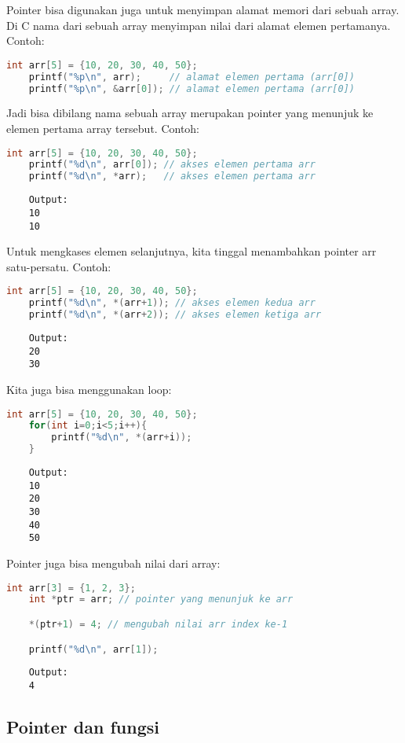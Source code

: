 Pointer bisa digunakan juga untuk menyimpan alamat memori dari sebuah array.
Di C nama dari sebuah array menyimpan nilai dari alamat elemen pertamanya.
Contoh:
\begin{lstlisting}[language=c]
	int arr[5] = {10, 20, 30, 40, 50};
	printf("%p\n", arr);     // alamat elemen pertama (arr[0])
	printf("%p\n", &arr[0]); // alamat elemen pertama (arr[0])
\end{lstlisting}
Jadi bisa dibilang nama sebuah array merupakan pointer yang menunjuk ke elemen pertama array tersebut.
Contoh:
\begin{lstlisting}[language=c]
	int arr[5] = {10, 20, 30, 40, 50};
	printf("%d\n", arr[0]); // akses elemen pertama arr
	printf("%d\n", *arr);   // akses elemen pertama arr    
\end{lstlisting}
\begin{verbatim}
    Output:
    10
    10
\end{verbatim}
Untuk mengkases elemen selanjutnya, kita tinggal menambahkan pointer arr satu-persatu.
Contoh:
\begin{lstlisting}[language=c]
	int arr[5] = {10, 20, 30, 40, 50};
	printf("%d\n", *(arr+1)); // akses elemen kedua arr
	printf("%d\n", *(arr+2)); // akses elemen ketiga arr    
\end{lstlisting}
\begin{verbatim}
    Output:
    20
    30
\end{verbatim}
Kita juga bisa menggunakan loop:
\begin{lstlisting}[language=c]
	int arr[5] = {10, 20, 30, 40, 50};
	for(int i=0;i<5;i++){
		printf("%d\n", *(arr+i));
	}
\end{lstlisting}    
\begin{verbatim}
	Output:
	10
	20
	30
	40
	50
\end{verbatim}
Pointer juga bisa mengubah nilai dari array:
\begin{lstlisting}[language=c]
	int arr[3] = {1, 2, 3};
	int *ptr = arr; // pointer yang menunjuk ke arr

	*(ptr+1) = 4; // mengubah nilai arr index ke-1

	printf("%d\n", arr[1]);
\end{lstlisting}
\begin{verbatim}
	Output:
	4
\end{verbatim}

\subsection{Pointer dan fungsi}

